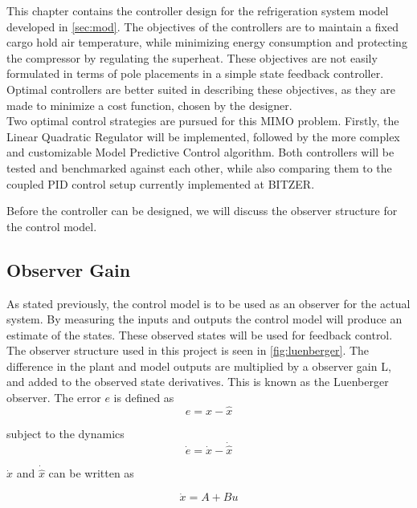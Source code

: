 This chapter contains the controller design for the refrigeration system model developed in \cref{sec:mod}. The objectives of the controllers are to maintain a fixed cargo hold air temperature, while minimizing energy consumption and protecting the compressor by regulating the superheat. These objectives are not easily formulated in terms of pole placements in a simple state feedback controller. Optimal controllers are better suited in describing these objectives, as they are made to minimize a cost function, chosen by the designer. \\

Two optimal control strategies are pursued for this MIMO problem. Firstly, the Linear Quadratic Regulator will be implemented, followed by the more complex and customizable Model Predictive Control algorithm. Both controllers will be tested and benchmarked against each other, while also comparing them to the coupled PID control setup currently implemented at BITZER.

Before the controller can be designed, we will discuss the observer structure for the control model.

\subsection{Observer Gain}\label{sec:observer-gain}
As stated previously, the control model is to be used as an observer for the actual system. By measuring the inputs and outputs the control model will produce an estimate of the states. These observed states will be used for feedback control. \\

The observer structure used in this project is seen in \cref{fig:luenberger}. The difference in the plant and model outputs are multiplied by a observer gain L, and added to the observed state derivatives. This is known as the Luenberger observer. The error $e$ is defined as
\begin{equation} \label{eq:error}
	e = x-\hat{x}
\end{equation}

subject to the dynamics
\begin{equation}
	\dot{e} = \dot{x}-\dot{\hat{x}}
\end{equation}

$\dot{x}$ and $\dot{\hat{x}}$ can be written as

\begin{equation}
	\dot{x} = A + Bu
\end{equation}


